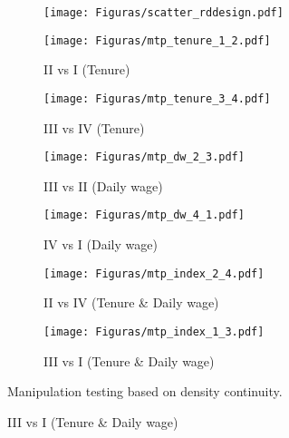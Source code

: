 \documentclass[oneside,11pt]{article}
\begin{document}
\begin{figure}[H]
     \caption{RD design}
    \label{rd_design}
\begin{center}
\begin{subfigure}{\textwidth}
        \texttt{[image: Figuras/scatter\_rddesign.pdf]}
    \end{subfigure}
  \end{center}
    \scriptsize 
\end{figure}



\begin{figure}[H]
     \caption{Manipulation test}
    \label{manipulation_test}
\begin{center}
\begin{subfigure}{0.49\textwidth}
\caption{II vs I (Tenure)}
        \texttt{[image: Figuras/mtp\_tenure\_1\_2.pdf]}
    \end{subfigure}
    \begin{subfigure}{0.49\textwidth}
\caption{III vs IV (Tenure)}
        \texttt{[image: Figuras/mtp\_tenure\_3\_4.pdf]}
    \end{subfigure}
\begin{subfigure}{0.49\textwidth}
\caption{III vs II (Daily wage)}
        \texttt{[image: Figuras/mtp\_dw\_2\_3.pdf]}
    \end{subfigure}
    \begin{subfigure}{0.49\textwidth}
\caption{IV vs I (Daily wage)}
        \texttt{[image: Figuras/mtp\_dw\_4\_1.pdf]}
    \end{subfigure}    
\begin{subfigure}{0.49\textwidth}
\caption{II vs IV (Tenure \& Daily wage)}
        \texttt{[image: Figuras/mtp\_index\_2\_4.pdf]}
    \end{subfigure}
    \begin{subfigure}{0.49\textwidth}
\caption{III vs I (Tenure \& Daily wage)}
        \texttt{[image: Figuras/mtp\_index\_1\_3.pdf]}
    \end{subfigure}        
  \end{center}
  
    \scriptsize Manipulation testing based on density continuity.
\end{figure}
\end{document}
